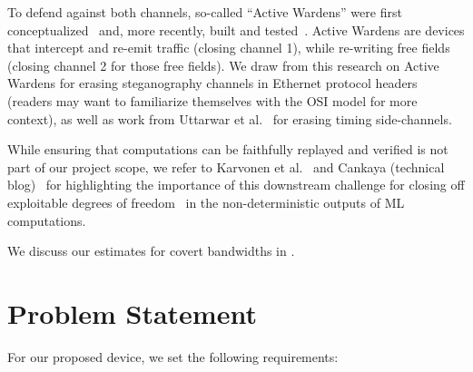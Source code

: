 \documentclass{article}
\begin{document}
To defend against both channels, so-called ``Active Wardens'' were first conceptualized~\cite{simmons1984prisoners,fisk2003eliminating} and, more recently, built and tested~\cite{xing2020netwarden}. Active Wardens are devices that intercept and re-emit traffic (closing channel 1), while re-writing free fields (closing channel 2 for those free fields). We draw from this research on Active Wardens for erasing steganography channels in Ethernet protocol headers (readers may want to familiarize themselves with the OSI model for more context), as well as work from Uttarwar et al.~\cite{uttarwar2025delay} for erasing timing side-channels.

While ensuring that computations can be faithfully replayed and verified is not part of our project scope, we refer to Karvonen et al.~\cite{karvonen2025difr} and Cankaya (technical blog)~\cite{cankaya2025catching1} for highlighting the importance of this downstream challenge for closing off exploitable degrees of freedom~\cite{rinberg2025verifying} in the non-deterministic outputs of ML computations.

We discuss our estimates for covert bandwidths in .

\section{Problem Statement}
\label{sec:problem}

For our proposed device, we set the following requirements:
\end{document}
